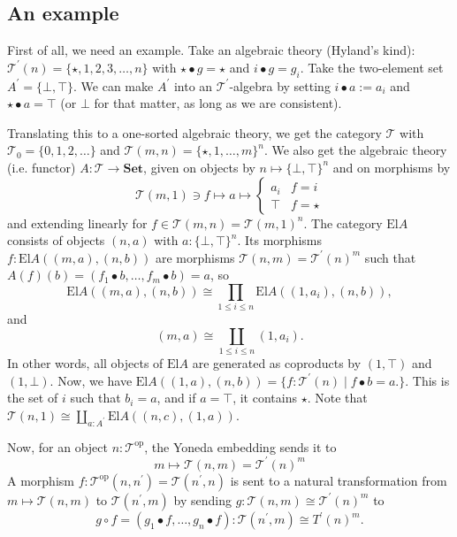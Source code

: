 \documentclass{amsbook}
\newcommand{\Catb}[1]{\mathbf{#1}}
\newcommand{\SET}{\Catb{Set}}
\newcommand{\Ob}[1]{{#1}_0}
\newcommand{\Hom}[3]{{#1}\left(#2,#3\right)}
\newcommand{\op}[1]{\ensuremath{{#1}^\text{op}}}
\theoremstyle{definition}
\begin{document}
  \subsection{An example}
  First of all, we need an example. Take an algebraic theory (Hyland's kind): $ \mathcal T^\prime(n) = \{\star, 1, 2, 3, \dots, n \} $ with $ \star \bullet g = \star $ and $ i \bullet g = g_i $. Take the two-element set $ A^\prime = \{ \bot, \top \} $. We can make $ A^\prime $ into an $ \mathcal T^\prime $-algebra by setting $ i \bullet a := a_i $ and $ \star \bullet a = \top $ (or $ \bot $ for that matter, as long as we are consistent).

  Translating this to a one-sorted algebraic theory, we get the category $ \mathcal T $ with $ \Ob{\mathcal T} = \{ 0, 1, 2, \dots \} $ and $ \mathcal T(m, n) = \{ \star, 1, \dots, m \}^n $. We also get the algebraic theory (i.e. functor) $ A: \mathcal T \to \SET $, given on objects by $ n \mapsto \{ \bot, \top \}^n $ and on morphisms by
  \[ \mathcal T(m, 1) \ni f \mapsto a \mapsto \left\{ \begin{array}{cc} a_i & f = i\\ \top & f = \star \end{array} \right. \]
  and extending linearly for $ f \in \mathcal T(m, n) = \mathcal T(m, 1)^n $. The category $ \mathrm{El} A $ consists of objects $ (n, a) $ with $ a : \{ \bot, \top \}^n $. Its morphisms $ f: \Hom{\mathrm{El} A}{(m, a)}{(n, b)} $ are morphisms $ \Hom{\mathcal T}{n}{m} = \mathcal T^\prime(n)^m $ such that $ A(f)(b) = (f_1 \bullet b, \dots, f_m \bullet b) = a $, so
  \[ \Hom{\mathrm{El} A}{(m, a)}{(n, b)} \cong \prod_{1 \leq i \leq n} \Hom{\mathrm{El} A}{(1, a_i)}{(n, b)}, \]
  and
  \[ (m, a) \cong \coprod_{1 \leq i \leq n} (1, a_i). \]
  In other words, all objects of $ \mathrm{El} A $ are generated as coproducts by $ (1, \top) $ and $ (1, \bot) $. Now, we have $ \Hom{\mathrm{El} A}{(1, a)}{(n, b)} = \{ f : \mathcal T^\prime(n) \mid f \bullet b = a. \} $. This is the set of $ i $ such that $ b_i = a $, and if $ a = \top $, it contains $ \star $. Note that $ \mathcal T(n, 1) \cong \coprod_{a : A^\prime} \Hom{\mathrm{El} A}{(n, c)}{(1, a)} $.

  Now, for an object $ n : \op{\mathcal T} $, the Yoneda embedding sends it to
  \[ m \mapsto \Hom{\mathcal T}{n}{m} = \mathcal T^\prime(n)^m \]
  A morphism $ f: \Hom{\op{\mathcal T}}{n}{n^\prime} = \Hom{\mathcal T}{n^\prime}{n} $ is sent to a natural transformation from $ m \mapsto \Hom{\mathcal T}{n}{m} $ to $ \Hom{\mathcal T}{n^\prime}{m} $ by sending $ g : \Hom{\mathcal T}{n}{m} \cong \mathcal T^\prime(n)^m $ to
  \[ g \circ f = (g_1 \bullet f, \dots, g_n \bullet f) : \Hom{\mathcal T}{n^\prime}{m} \cong T^\prime(n)^m. \]
\end{document}
